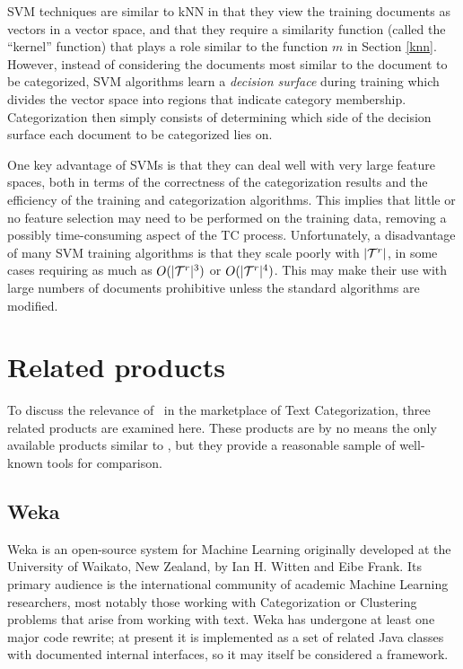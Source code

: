 SVM techniques are similar to kNN in that they view the training
documents as vectors in a vector space, and that they require a
similarity function (called the ``kernel'' function) that plays a role
similar to the function $m$ in Section
\ref{knn}.\cite[ch. 1]{scholkopf:02} However, instead of considering
the documents most similar to the document to be categorized, SVM
algorithms learn a \emph{decision surface} during training which
divides the vector space into regions that indicate category
membership.  Categorization then simply consists of determining which
side of the decision surface each document to be categorized lies on.

One key advantage of SVMs is that they can deal well with very large
feature spaces, both in terms of the correctness of the categorization
results and the efficiency of the training and categorization
algorithms.  This implies that little or no feature selection may need
to be performed on the training data, removing a possibly
time-consuming aspect of the TC process.  Unfortunately, a
disadvantage of many SVM training algorithms is that they scale poorly
with $|\mathcal{T}^r|$, in some cases requiring as much as $O(|\mathcal{T}^r|^3)$ or
$O(|\mathcal{T}^r|^4)$.  This may make their use with large numbers of
documents prohibitive unless the standard algorithms are modified.


\section{Related products}

To discuss the relevance of \aicat\ in the marketplace of Text
Categorization, three related products are examined here.  These
products are by no means the only available products similar to
\aicat, but they provide a reasonable sample of well-known tools for
comparison.

\subsection{Weka}

Weka is an open-source system for Machine Learning originally
developed at the University of Waikato, New Zealand, by Ian H. Witten
and Eibe Frank.\cite{weka:99} Its primary
audience is the international community of academic Machine Learning
researchers, most notably those working with Categorization or
Clustering problems that arise from working with text.  Weka has
undergone at least one major code rewrite; at present it is
implemented as a set of related Java classes with documented internal
interfaces, so it may itself be considered a framework.

